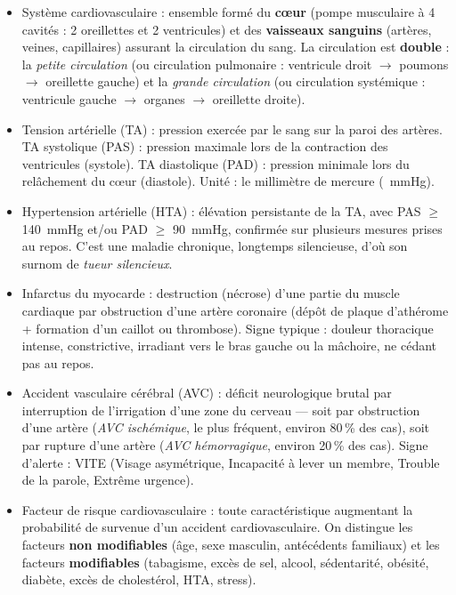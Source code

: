 \documentclass[11pt]{article}
\newcommand{\cle}[1]{{\popxbold\color{popdark}#1}}
\newcounter{popsec}
\newcounter{popsub}
\newcommand{\courssub}[1]{%
  \stepcounter{popsub}%
  \par\vspace{9pt}\noindent{\popxbold\fontsize{11.5}{13}\selectfont\color{popink}{\color{poporange}\thepopsec.\thepopsub}\hspace{6pt}#1}\par\nopagebreak\vspace{4pt}
}
\begin{document}
\courssub{Définitions clés}
\begin{itemize}
  \item \cle{Système cardiovasculaire} : ensemble formé du \textbf{cœur} (pompe musculaire à 4 cavités : 2 oreillettes et 2 ventricules) et des \textbf{vaisseaux sanguins} (artères, veines, capillaires) assurant la circulation du sang. La circulation est \textbf{double} : la \emph{petite circulation} (ou circulation pulmonaire : ventricule droit $\to$ poumons $\to$ oreillette gauche) et la \emph{grande circulation} (ou circulation systémique : ventricule gauche $\to$ organes $\to$ oreillette droite).
  \item \cle{Tension artérielle (TA)} : pression exercée par le sang sur la paroi des artères. \cle{TA systolique (PAS)} : pression maximale lors de la contraction des ventricules (systole). \cle{TA diastolique (PAD)} : pression minimale lors du relâchement du cœur (diastole). Unité : le millimètre de mercure (\SI{}{mmHg}).
  \item \cle{Hypertension artérielle (HTA)} : élévation persistante de la TA, avec PAS $\ge$ \SI{140}{mmHg} et/ou PAD $\ge$ \SI{90}{mmHg}, confirmée sur plusieurs mesures prises au repos. C'est une maladie chronique, longtemps silencieuse, d'où son surnom de \emph{tueur silencieux}.
  \item \cle{Infarctus du myocarde} : destruction (nécrose) d'une partie du muscle cardiaque par obstruction d'une artère coronaire (dépôt de plaque d'athérome + formation d'un caillot ou thrombose). Signe typique : douleur thoracique intense, constrictive, irradiant vers le bras gauche ou la mâchoire, ne cédant pas au repos.
  \item \cle{Accident vasculaire cérébral (AVC)} : déficit neurologique brutal par interruption de l'irrigation d'une zone du cerveau — soit par obstruction d'une artère (\emph{AVC ischémique}, le plus fréquent, environ 80\,\% des cas), soit par rupture d'une artère (\emph{AVC hémorragique}, environ 20\,\% des cas). Signe d'alerte : \cle{VITE} (Visage asymétrique, Incapacité à lever un membre, Trouble de la parole, Extrême urgence).
  \item \cle{Facteur de risque cardiovasculaire} : toute caractéristique augmentant la probabilité de survenue d'un accident cardiovasculaire. On distingue les facteurs \textbf{non modifiables} (âge, sexe masculin, antécédents familiaux) et les facteurs \textbf{modifiables} (tabagisme, excès de sel, alcool, sédentarité, obésité, diabète, excès de cholestérol, HTA, stress).
\end{itemize}
\end{document}
